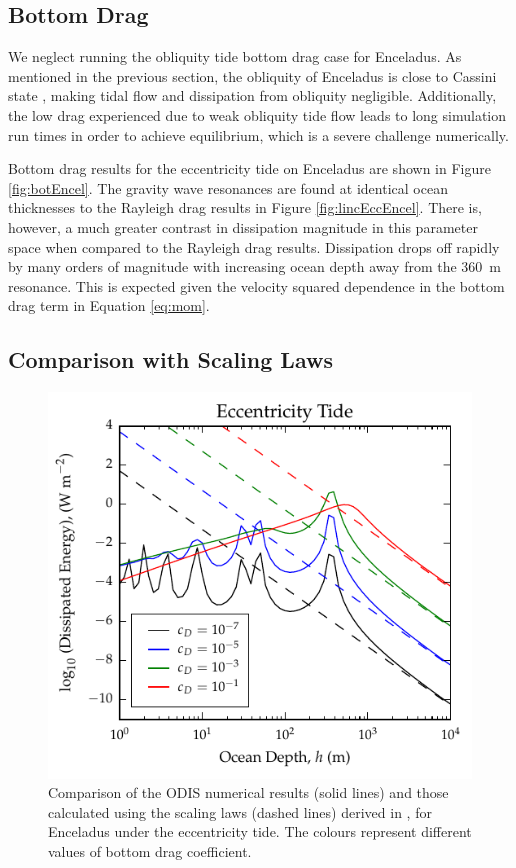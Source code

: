 \subsection{Bottom Drag}

We neglect running the obliquity tide bottom drag case for Enceladus. As mentioned in the previous section, the obliquity of Enceladus is close to Cassini state \citep{chen2011obliquity,chen2013tidal}, making tidal flow and dissipation from obliquity negligible. Additionally, the low drag experienced due to weak obliquity tide flow leads to long simulation run times in order to achieve equilibrium, which is a severe challenge numerically.

Bottom drag results for the eccentricity tide on Enceladus are shown in Figure \ref{fig:botEncel}. The gravity wave resonances are found at identical ocean thicknesses to the Rayleigh drag results in Figure \ref{fig:lincEccEncel}. There is, however, a much greater contrast in dissipation magnitude in this parameter space when compared to the Rayleigh drag results. Dissipation drops off rapidly by many orders of magnitude with increasing ocean depth away from the \SI{360}{\metre} resonance. This is expected given the velocity squared dependence in the bottom drag term in Equation \ref{eq:mom}. 

\subsection{Comparison with Scaling Laws}

\begin{figure}[!b]
\centering
\includegraphics[width=0.85\linewidth]{Figures/enceladus_scaling}
\caption{Comparison of the ODIS numerical results (solid lines) and those calculated using the scaling laws (dashed lines) derived in \citet{chen2013tidal}, for Enceladus under the eccentricity tide. The colours represent different values of bottom drag coefficient. \label{fig:scalEncel}}
\end{figure}

